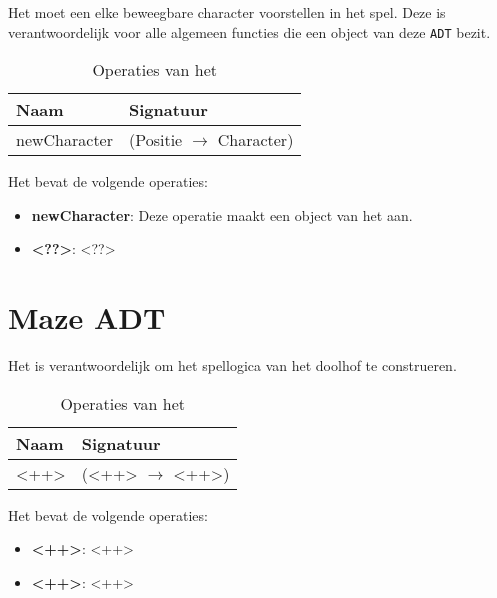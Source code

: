 Het \texttt{} moet een elke beweegbare character voorstellen in het spel.
Deze is verantwoordelijk voor alle algemeen functies die een object van deze \texttt{ADT} bezit.

\begin{table}[hbt]
\centering
\begin{tabular}{|ll|}
\hline
\rowcolor[HTML]{000000} 
{\color[HTML]{FFFFFF} \textbf{Naam}} & {\color[HTML]{FFFFFF} \textbf{Signatuur}} \\ \hline
newCharacter                                 & (Positie $\rightarrow$ Character)                                       \\ \hline
\end{tabular}
\caption{Operaties van het \texttt{}}
\label{table:character}
\end{table}

Het \texttt{} bevat de volgende operaties:

\begin{itemize}
	\item \textbf{newCharacter}: Deze operatie maakt een object van het \texttt{} aan.
	\item \textbf{<??>}: <??>
\end{itemize}

\section{Maze ADT}
\label{section:maze}

Het \texttt{} is verantwoordelijk om het spellogica van het doolhof te construeren.

\begin{table}[hbt]
\centering
\begin{tabular}{|ll|}
\hline
\rowcolor[HTML]{000000} 
{\color[HTML]{FFFFFF} \textbf{Naam}} & {\color[HTML]{FFFFFF} \textbf{Signatuur}} \\ \hline
<++>                                 & (<++> $\rightarrow$ <++>)                                       \\ \hline
\end{tabular}
\caption{Operaties van het \texttt{}}
\label{table:maze}
\end{table}

Het \texttt{} bevat de volgende operaties:

\begin{itemize}
	\item \textbf{<++>}: <++>
	\item \textbf{<++>}: <++>
\end{itemize}

